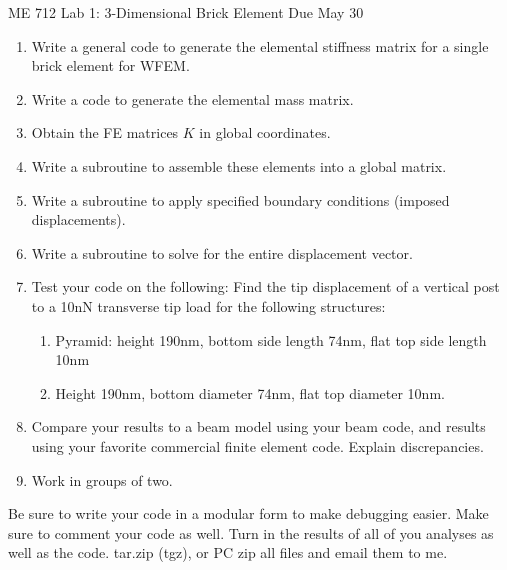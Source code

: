 \documentclass[11pt]{article}
\begin{document}
\begin{center}
	\LARGE{ME 712 Lab 1: 3-Dimensional Brick Element}
	Due May 30
\end{center}
\vspace{.3in}
\begin{enumerate}

\item Write a general code to generate the elemental stiffness matrix for a single  brick element for WFEM.  

\item Write a code to generate the elemental mass matrix.

\item Obtain the FE matrices $K$ in global coordinates.

\item Write a subroutine to assemble these elements into a global matrix.

\item Write a subroutine to apply specified boundary conditions (imposed 
displacements).

\item Write a subroutine to solve for the entire displacement vector.

\item Test your code on the following:\label{it2} 
Find the tip displacement of a vertical post to a 10nN transverse tip load for the following structures:
\begin{enumerate}
	\item Pyramid: height 190nm, bottom side length 74nm, flat top side length 10nm
	\item Height 190nm, bottom diameter 74nm, flat top diameter 10nm.
\end{enumerate}


\item Compare  your results to a beam model using your beam code, and results using your favorite commercial finite element code. Explain discrepancies. 

\item Work in groups of two. 
	
	

\end{enumerate}



\noindent Be sure to write your code in a modular form to make debugging easier. 
Make sure to comment your code as well.  Turn in the results of all of you
analyses as well as the code. tar.zip (tgz), or PC zip all files and email them to me.
\end{document}
